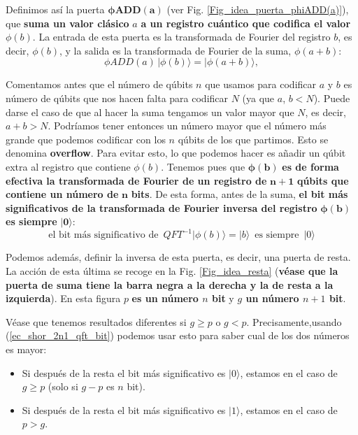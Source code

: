 \documentclass[a4paper,11pt]{book} %
\numberwithin{equation}{chapter}
\begin{document}
Definimos así la puerta $\bm{\phi ADD(a)}$ (ver Fig. \ref{Fig_idea_puerta_phiADD(a)}), que \textbf{suma un valor clásico} $a$ \textbf{a un registro cuántico que codifica el valor} $ \phi(b)$. La entrada de esta puerta es la transformada de Fourier del registro $b$, es decir, $\phi (b)$, y la salida es la transformada de Fourier de la suma, $\phi (a+b)$:
	\begin{equation}
	\boxed{\phi ADD(a) \, |\phi (b) \rangle = |\phi (a+b) \rangle},
	\end{equation}

Comentamos antes que el número de qúbits $n$ que usamos para codificar $a$ y $b$ es número de qúbits que nos hacen falta para codificar $N$ (ya que $a$, $b < N$). Puede darse el caso de que al hacer la suma tengamos un valor mayor que $N$, es decir, $a+b > N$. Podríamos tener entonces un número mayor que el número más grande que podemos codificar con los $n$ qúbits de los que partimos. Esto se denomina \textbf{overflow}. Para evitar esto, lo que podemos hacer es añadir un qúbit extra al registro que contiene $\phi (b)$. Tenemos pues que $\bm{\phi(b)}$ \textbf{es de forma efectiva la transformada de Fourier de un registro de} $\bm{n+1}$ \textbf{qúbits que contiene un número de} $\bm n$ \textbf{bits}. De esta forma, antes de la suma, \textbf{el bit más significativos de la transformada de Fourier inversa del registro} $\bm{\phi(b)}$ \textbf{es siempre} $\bm{|0 \rangle}$:
	\begin{equation} \label{ec_shor_2n1_qft_bit}
	\boxed{\text{el bit más significativo de } \, QFT^{-1}|\phi(b) \rangle = |b \rangle \, \text{ es siempre } \, |0 \rangle}
	\end{equation}

Podemos además, definir la inversa de esta puerta, es decir, una puerta de resta. La acción de esta última se recoge en la Fig. \ref{Fig_idea_resta} (\textbf{véase que la puerta de suma tiene la barra negra a la derecha y la de resta a la izquierda}). En esta figura $p$ \textbf{es un número $n$ bit} y \textbf{$g$ un número ${n+1}$ bit}. 

Véase que tenemos resultados diferentes si $g \geq p $ o $g < p$. Precisamente,usando (\ref{ec_shor_2n1_qft_bit}) podemos usar esto para saber cual de los dos números es mayor:

\begin{itemize}
	\item Si después de la resta el bit más significativo es $|0 \rangle$, estamos en el caso de $g \geq p$ (solo si $g-p$ es $n$ bit).
	
	\item Si después de la resta el bit más significativo es $|1 \rangle$, estamos en el caso de $p>g$.
\end{itemize}
\end{document}
